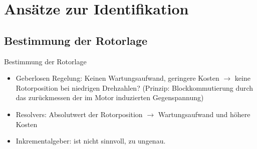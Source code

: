 \documentclass{beamer}
\begin{document}
\section{Ansätze zur Identifikation}
\subsection{Bestimmung der Rotorlage}
\begin{frame}{Bestimmung der Rotorlage}
	\begin{itemize}
		\item Geberlosen Regelung: Keinen Wartungsaufwand, geringere Kosten $\rightarrow$ keine Rotorposition bei niedrigen Drehzahlen? (Prinzip: Blockkommutierung durch das zurückmessen der im Motor induzierten Gegenspannung)
		\item Resolvers: Absolutwert der Rotorposition $\rightarrow$ Wartungsaufwand und höhere Kosten
		\item Inkrementalgeber: ist nicht sinnvoll, zu ungenau.
	\end{itemize}
\end{frame}
\end{document}
